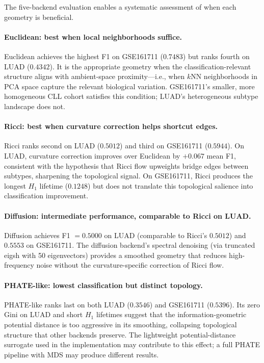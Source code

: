 \documentclass[11pt]{article}
\begin{document}
The five-backend evaluation enables a systematic assessment of when each geometry is beneficial.

\paragraph{Euclidean: best when local neighborhoods suffice.}
Euclidean achieves the highest F1 on GSE161711 ($0.7483$) but ranks fourth on LUAD ($0.4342$).
It is the appropriate geometry when the classification-relevant structure aligns with ambient-space proximity---i.e., when $k$NN neighborhoods in PCA space capture the relevant biological variation.
GSE161711's smaller, more homogeneous CLL cohort satisfies this condition; LUAD's heterogeneous subtype landscape does not.

\paragraph{Ricci: best when curvature correction helps shortcut edges.}
Ricci ranks second on LUAD ($0.5012$) and third on GSE161711 ($0.5944$).
On LUAD, curvature correction improves over Euclidean by $+0.067$ mean F1, consistent with the hypothesis that Ricci flow upweights bridge edges between subtypes, sharpening the topological signal.
On GSE161711, Ricci produces the longest $H_1$ lifetime ($0.1248$) but does not translate this topological salience into classification improvement.

\paragraph{Diffusion: intermediate performance, comparable to Ricci on LUAD.}
Diffusion achieves F1 $= 0.5000$ on LUAD (comparable to Ricci's $0.5012$) and $0.5553$ on GSE161711.
The diffusion backend's spectral denoising (via truncated eigsh with 50 eigenvectors) provides a smoothed geometry that reduces high-frequency noise without the curvature-specific correction of Ricci flow.

\paragraph{PHATE-like: lowest classification but distinct topology.}
PHATE-like ranks last on both LUAD ($0.3546$) and GSE161711 ($0.5396$).
Its zero Gini on LUAD and short $H_1$ lifetimes suggest that the information-geometric potential distance is too aggressive in its smoothing, collapsing topological structure that other backends preserve.
The lightweight potential-distance surrogate used in the implementation may contribute to this effect; a full PHATE pipeline with MDS may produce different results.
\end{document}
